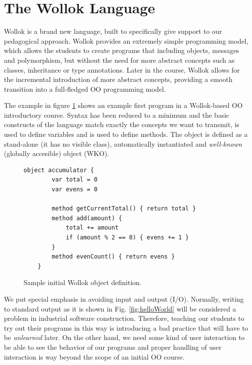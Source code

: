 \section{The Wollok Language}
\label{sec:wollokLanguage}


Wollok is a brand new language, built to specifically give support to our pedagogical approach. 
Wollok provides an extremely simple programming model, which allows the students to create programs that including objects, messages and polymorphism, but without the need for more abstract concepts such as classes, inheritance or type annotations.
Later in the course, Wollok allows for the incremental introduction of more abstract concepts,
providing a smooth transition into a full-fledged OO programming model.

The example in figure \ref{fig:helloWorld/wollok} shows an example first program in a Wollok-based OO introductory course.
Syntax has been reduced to a minimum and the basic constructs of the language match exactly the concepts we want to transmit, \eg {} is used to define variables and  is used to define methods.
The  object is defined as a stand-alone (\ie it has no visible class), automatically instantiated and \emph{well-known} (\ie globally accesible) object (WKO).

\vspace{-3mm}
\begin{figure}[ht]
 \centering
 \begin{lstlisting}[language=Wollok]
	object accumulator {
		var total = 0
		var evens = 0
		
		method getCurrentTotal() { return total }
		method add(amount) { 
			total += amount 
			if (amount % 2 == 0) { evens += 1 }
		}
		method evenCount() { return evens }
	}\end{lstlisting}
\vspace{-3mm}
\caption{\small Sample initial Wollok object definition.}
\label{fig:helloWorld/wollok}
\end{figure}

\medskip 

We put special emphasis in avoiding input and output (I/O). 
Normally, writing to standard output as it is shown in Fig. \ref{fig:helloWorld} will be considered a problem in industrial software construction.
Therefore, teaching our students to try out their programs in this way is introducing a bad practice that will have to be \emph{unlearned} later.
On the other hand, we need some kind of user interaction to be able to see the behavior of our programs and proper handling of user interaction is way beyond the scope of an initial OO course.

